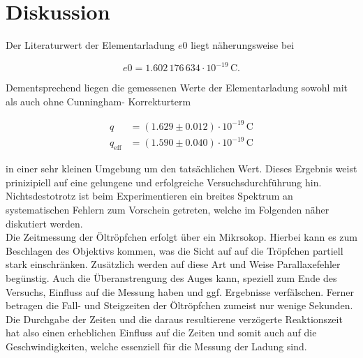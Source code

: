 


\section{Diskussion}
\label{sec:Diskussion}

Der Literaturwert\cite{Elementarladung} der Elementarladung $e0$ liegt näherungsweise bei 

\begin{equation*}
    e0 = 1.602\,176\,634\cdot{}10^{-19}\,\unit{\coulomb}.
\end{equation*}

\noindent Dementsprechend liegen die gemessenen Werte der Elementarladung sowohl mit als auch ohne Cunningham-
Korrekturterm 

\begin{align*}
    q            &= \left(1.629\pm0.012\right)\cdot10^{-19}\,\unit{\coulomb} \\
    q_\text{eff} &= \left(1.590 \pm0.040\right)\cdot10^{-19}\,\unit{\coulomb} 
\end{align*}

in einer sehr kleinen Umgebung um den tatsächlichen Wert. Dieses Ergebnis weist prinizipiell auf eine gelungene und 
erfolgreiche Versuchsdurchführung hin. Nichtsdestotrotz ist beim Experimentieren ein breites Spektrum an systematischen 
Fehlern zum Vorschein getreten, welche im Folgenden näher diskutiert werden.\\

\noindent Die Zeitmessung der Öltröpfchen erfolgt über ein Mikrsokop. Hierbei kann es zum Beschlagen des Objektivs 
kommen, was die Sicht auf auf die Tröpfchen partiell stark einschränken. Zusätzlich werden auf diese Art und Weise 
Parallaxefehler begünstig. Auch die Überanstrengung des Auges kann, speziell zum Ende des Versuchs, Einfluss auf die 
Messung haben und ggf. Ergebnisse verfälschen. Ferner betragen die Fall- und Steigzeiten der Öltröpfchen zumeist nur 
wenige Sekunden. Die Durchgabe der Zeiten und die daraus resultierene verzögerte Reaktionszeit hat also einen erheblichen 
Einfluss auf die Zeiten und somit auch auf die Geschwindigkeiten, welche essenziell für die Messung der Ladung sind.\\


